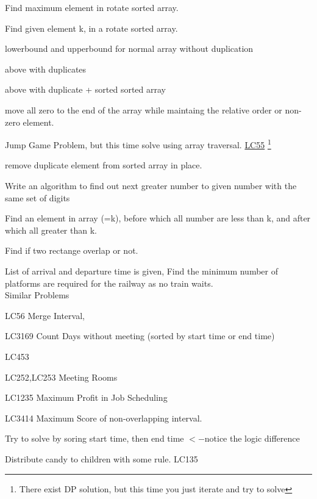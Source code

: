 {\begin{exercise}
\begin{compactenum}
        \item Find maximum element in rotate sorted array.
        \item Find given element k, in a rotate sorted array.
        \item lowerbound and upperbound for normal array without duplication
        \item above with duplicates
        \item above with duplicate + sorted sorted array
    \end{compactenum}

    \begin{compactenum}
    \item move all zero to the end of the array while maintaing the relative order or non-zero element.
    \item Jump Game Problem, but this time solve using array traversal. 
    \href{https://leetcode.com/problems/jump-game/description/}{LC55}
    \footnote{There exist DP solution, but this time you just iterate and try to solve}
    \item remove duplicate element from sorted array in place.
    
    \item Write an algorithm to find out next greater number to given number with the same set of digits
    \item Find an element in array (=k), before which all number are less than k, and after which all greater than k.
    \item Find if two rectange overlap or not.
    \item List of arrival and departure time is given, Find the minimum number of platforms are required for the railway as no train waits.
    \\Similar Problems
    \begin{compactenum}
        \item LC56 Merge Interval,
        \item LC3169 Count Days without meeting (sorted by start time or end time)
        \item LC453
        \item LC252,LC253 Meeting Rooms
        \item LC1235 Maximum Profit in Job Scheduling
        \item LC3414 Maximum Score of non-overlapping interval.
        \item Try to solve by soring start time, then end time $<-$notice the logic difference
    \end{compactenum}
    \vspace{4pt}
    \item Distribute candy to children  with some rule. LC135
    

\end{compactenum}
\end{exercise}}
